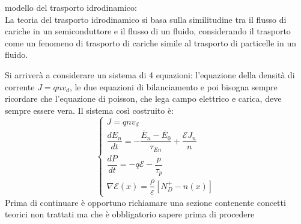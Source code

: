 %
\begin{ricevimento}
   modello del trasporto idrodinamico:\\
La teoria del trasporto idrodinamico si basa sulla similitudine tra il flusso di cariche in un semiconduttore e il flusso di un fluido, considerando il trasporto come un fenomeno di trasporto di cariche simile al trasporto di particelle in un fluido.\\
\end{ricevimento}

Si arriverà a considerare un sistema di 4 equazioni: l'equazione della densità di corrente $J=qnv_d$, le due equazioni di bilanciamento e poi bisogna sempre ricordare che l'equazione di poisson, che lega campo elettrico e carica, deve sempre essere vera. Il sistema così costruito è:
%
\begin{equation}
    \begin{cases}
        J=qnv_d\\
         \dfrac{dE_n}{dt}=-\dfrac{\overline{E}_n - \overline{E}_0}{\tau_{En}}+ \dfrac{\mathcal{E} J_n}{n}\\
         \dfrac{dP}{dt}=-q\mathcal{E}-\dfrac{p}{\tau_p}\\
         \nabla \mathcal{E}(x)=\dfrac{\rho}{\varepsilon}[N_D^+-n(x)]
    \end{cases}
\end{equation}
%
Prima di continuare è opportuno richiamare una sezione contenente concetti teorici non trattati ma che è obbligatorio sapere prima di procedere 
%
